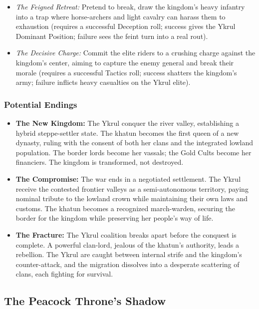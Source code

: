 \documentclass[11pt]{article}
\begin{document}
\begin{enumerate}
\begin{itemize}
\item \textit{The Feigned Retreat:} Pretend to break, draw the kingdom's heavy infantry into a trap where horse-archers and light cavalry can harass them to exhaustion (requires a successful Deception roll; success gives the Ykrul Dominant Position; failure sees the feint turn into a real rout).
\item \textit{The Decisive Charge:} Commit the elite riders to a crushing charge against the kingdom's center, aiming to capture the enemy general and break their morale (requires a successful Tactics roll; success shatters the kingdom's army; failure inflicts heavy casualties on the Ykrul elite).
\end{itemize}
\end{enumerate}

\subsubsection{Potential Endings}
\begin{itemize}
\item \textbf{The New Kingdom:} The Ykrul conquer the river valley, establishing a hybrid steppe-settler state. The khatun becomes the first queen of a new dynasty, ruling with the consent of both her clans and the integrated lowland population. The border lords become her vassals; the Gold Cults become her financiers. The kingdom is transformed, not destroyed.
\item \textbf{The Compromise:} The war ends in a negotiated settlement. The Ykrul receive the contested frontier valleys as a semi-autonomous territory, paying nominal tribute to the lowland crown while maintaining their own laws and customs. The khatun becomes a recognized march-warden, securing the border for the kingdom while preserving her people's way of life.
\item \textbf{The Fracture:} The Ykrul coalition breaks apart before the conquest is complete. A powerful clan-lord, jealous of the khatun's authority, leads a rebellion. The Ykrul are caught between internal strife and the kingdom's counter-attack, and the migration dissolves into a desperate scattering of clans, each fighting for survival.
\end{itemize}

\subsection{The Peacock Throne's Shadow}
\end{document}
